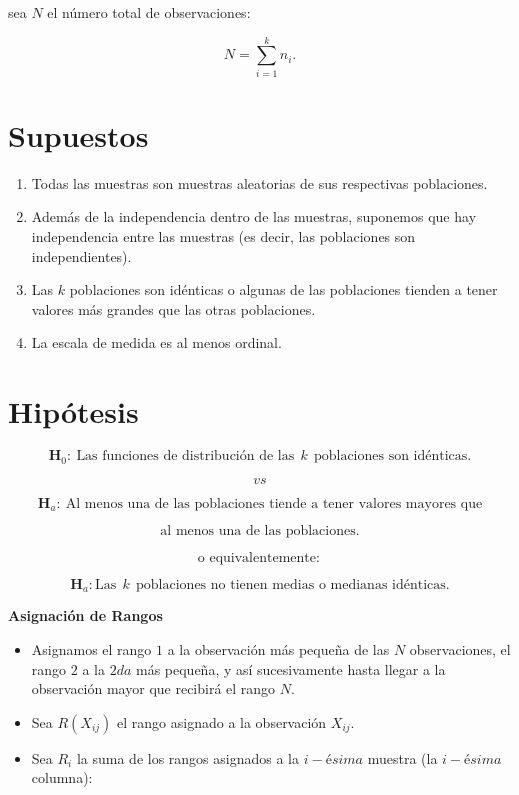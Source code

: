 \documentclass[
  a4paper,
  oneside,
  openany]{book}
\begin{document}
sea \(N\) el número total de observaciones:

\[ N= \sum_{i=1}^{k} n_{i}.\]

\hypertarget{supuestos-7}{%
\section{Supuestos}\label{supuestos-7}}

\begin{enumerate}
\def\labelenumi{\arabic{enumi})}
\item
  Todas las muestras son muestras aleatorias de sus respectivas poblaciones.
\item
  Además de la independencia dentro de las muestras, suponemos que hay independencia entre las muestras (es decir, las poblaciones son independientes).
\item
  Las \(k\) poblaciones son idénticas o algunas de las poblaciones tienden a tener valores más grandes que las otras poblaciones.
\item
  La escala de medida es al menos ordinal.
\end{enumerate}

\hypertarget{hipuxf3tesis-6}{%
\section{Hipótesis}\label{hipuxf3tesis-6}}

\[\textbf{H}_0: \ \mbox{Las funciones de distribución de las} \ \  k \ \ \mbox{poblaciones son idénticas.}\]

\[vs\]

\[\textbf{H}_a: \ \mbox{Al menos una de las poblaciones tiende a tener valores mayores que}\]

\[\mbox{al menos una de las poblaciones.}\]

\[\mbox{o equivalentemente}:\]

\[\textbf{H}_a: \mbox{Las} \ \ k \ \  \mbox{poblaciones no tienen medias o medianas idénticas.}\]

\textbf{Asignación de Rangos}

\begin{itemize}
\item
  Asignamos el rango \(1\) a la observación más pequeña de las \(N\) observaciones, el rango \(2\) a la \(2da\) más pequeña, y así sucesivamente hasta llegar a la observación mayor que recibirá el rango \(N\).
\item
  Sea \(R(X_{ij})\) el rango asignado a la observación \(X_{ij}.\)
\item
  Sea \(R_{i}\) la suma de los rangos asignados a la \(i-ésima\) muestra (la \(i-ésima\) columna):
\end{itemize}
\end{document}
